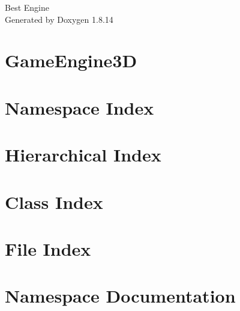 \documentclass[twoside]{book}
\newcommand{\+}{\discretionary{\mbox{\scriptsize$\hookleftarrow$}}{}{}}
\newcommand{\clearemptydoublepage}{%
  \newpage{\pagestyle{empty}\cleardoublepage}%
}
\begin{document}
\hypersetup{pageanchor=false,
             bookmarksnumbered=true,
             pdfencoding=unicode
            }
\begin{titlepage}
\vspace*{7cm}
\begin{center}%
{\Large Best Engine }\\
\vspace*{1cm}
{\large Generated by Doxygen 1.8.14}\\
\end{center}
\end{titlepage}
\clearemptydoublepage
{}
\tableofcontents
\clearemptydoublepage
{}
\hypersetup{pageanchor=true}

\chapter{Game\+Engine3D}
\label{md__d_1__projects__game_engine3_d__r_e_a_d_m_e}

\chapter{Namespace Index}

\chapter{Hierarchical Index}

\chapter{Class Index}

\chapter{File Index}

\chapter{Namespace Documentation}


\end{document}
